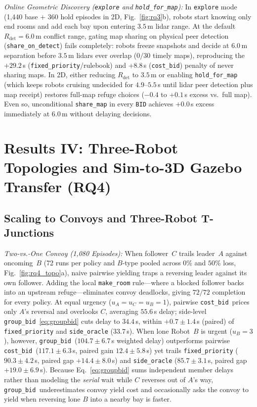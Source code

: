 \documentclass[letterpaper,journal]{IEEEtran}
\newcommand{\cb}{\texttt{cost\_bid}}
\newcommand{\gb}{\texttt{group\_bid}}
\begin{document}
\smallskip\noindent\emph{Online Geometric Discovery (\texttt{explore} and \texttt{hold\_for\_map}):} In \texttt{explore} mode (1,440 base + 360 hold episodes in 2D, Fig.~\ref{fig:rq3}b), robots start knowing only end rooms and add each bay upon entering $3.5$\,m lidar range. At the default $R_{\mathrm{det}}=6.0$\,m conflict range, gating map sharing on physical peer detection (\texttt{share\_on\_detect}) fails completely: robots freeze snapshots and decide at $6.0$\,m separation before $3.5$\,m lidars ever overlap ($0/30$ timely maps), reproducing the $+29.2$\,s (\texttt{fixed\_priority}/rulebook) and $+8.8$\,s (\cb) penalty of never sharing maps. In 2D, either reducing $R_{\mathrm{det}}$ to $3.5$\,m or enabling \texttt{hold\_for\_map} (which keeps robots cruising undecided for $4.9$--$5.5$\,s until lidar peer detection plus map receipt) restores full-map refuge choices ($-0.4$ to $+0.1$\,s excess vs.\ full map). Even so, unconditional \texttt{share\_map} in every \texttt{BID} achieves $+0.0$\,s excess immediately at $6.0$\,m without delaying decisions.

\section{Results IV: Three-Robot Topologies and Sim-to-3D Gazebo Transfer (RQ4)}\label{sec:rq4}

\subsection{Scaling to Convoys and Three-Robot T-Junctions}
\smallskip\noindent\emph{Two-vs.-One Convoy (1,080 Episodes):} When follower~$C$ trails leader~$A$ against oncoming~$B$ (72 runs per policy and $B$-type pooled across $0\%$ and $50\%$ loss, Fig.~\ref{fig:rq4_topo}a), naive pairwise yielding traps a reversing leader against its own follower. Adding the local \texttt{make\_room} rule---where a blocked follower backs into an upstream refuge---eliminates convoy deadlocks, giving $72/72$ completion for every policy. At equal urgency ($u_A=u_C=u_B=1$), pairwise \cb\ prices only $A$'s reversal and overlooks $C$, averaging $55.6$\,s delay; side-level \gb~\eqref{eq:groupbid} cuts delay to $34.4$\,s, within $+0.7\pm 1.4$\,s (paired) of \texttt{fixed\_priority} and \texttt{side\_oracle} ($33.7$\,s). When lone Robot~$B$ is urgent ($u_B=3$), however, \gb\ ($104.7\pm 6.7$\,s weighted delay) outperforms pairwise \cb\ ($117.1\pm 6.3$\,s, paired gain $12.4\pm 5.8$\,s) yet trails \texttt{fixed\_priority} ($90.3\pm 4.2$\,s, paired gap $+14.4\pm 8.0$\,s) and \texttt{side\_oracle} ($85.7\pm 3.1$\,s, paired gap $+19.0\pm 6.9$\,s). Because Eq.~\eqref{eq:groupbid} sums independent member delays rather than modeling the \emph{serial} wait while $C$ reverses out of $A$'s way, \gb\ underestimates convoy yield cost and occasionally asks the convoy to yield when reversing lone $B$ into a nearby bay is faster.
\end{document}
